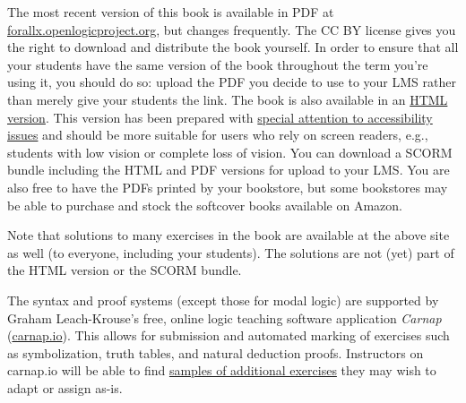 The most recent version of this book is available in PDF at
\href{https://forallx.openlogicproject.org}{forallx.openlogicproject.org},
but changes frequently.  The CC BY license gives you the right to
download and distribute the book yourself. In order to ensure that all
your students have the same version of the book throughout the term
you're using it, you should do so: upload the PDF you decide to use to
your LMS rather than merely give your students the link. The book is
also available in an
\href{https://forallx.openlogicproject.org/html/}{HTML version}. This
version has been prepared with
\href{https://forallx.openlogicproject.org/html/A4.html}{special
attention to accessibility issues} and should be more suitable for
users who rely on screen readers, e.g., students with low vision or
complete loss of vision. You can download a SCORM bundle including the
HTML and PDF versions for upload to your LMS. You are also free to
have the PDFs printed by your bookstore, but some bookstores may be
able to purchase and stock the softcover books available on Amazon.

Note that solutions to many exercises in the book are available at the
above site as well (to everyone, including your students). The
solutions are not (yet) part of the HTML version or the SCORM bundle.

The syntax and proof systems (except those for modal logic) are supported by Graham Leach-Krouse's free, online logic teaching software application \textit{Carnap} (\href{https://carnap.io}{carnap.io}). This allows for submission and automated marking of exercises such as symbolization, truth tables, and natural deduction proofs.  Instructors on carnap.io will be able to find \href{https://carnap.io/shared/rzach@ucalgary.ca/forall%20x:%20Calgary.md}{samples of additional exercises} they may wish to adapt or assign as-is.